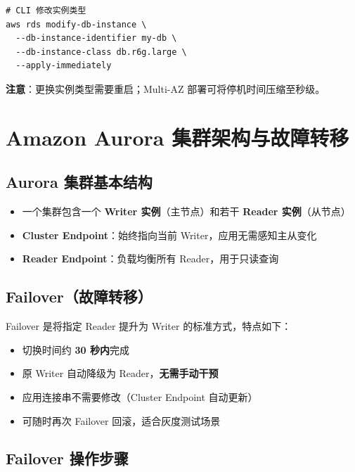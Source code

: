 \documentclass[12pt, a4paper]{article}
\begin{document}
\begin{lstlisting}
# CLI 修改实例类型
aws rds modify-db-instance \
  --db-instance-identifier my-db \
  --db-instance-class db.r6g.large \
  --apply-immediately
\end{lstlisting}

\textbf{注意}：更换实例类型需要重启；Multi-AZ 部署可将停机时间压缩至秒级。

\section{Amazon Aurora 集群架构与故障转移}

\subsection{Aurora 集群基本结构}

\begin{itemize}[leftmargin=2em]
  \item 一个集群包含一个 \textbf{Writer 实例}（主节点）和若干 \textbf{Reader 实例}（从节点）
  \item \textbf{Cluster Endpoint}：始终指向当前 Writer，应用无需感知主从变化
  \item \textbf{Reader Endpoint}：负载均衡所有 Reader，用于只读查询
\end{itemize}

\subsection{Failover（故障转移）}

Failover 是将指定 Reader 提升为 Writer 的标准方式，特点如下：

\begin{itemize}[leftmargin=2em]
  \item 切换时间约 \textbf{30 秒内}完成
  \item 原 Writer 自动降级为 Reader，\textbf{无需手动干预}
  \item 应用连接串不需要修改（Cluster Endpoint 自动更新）
  \item 可随时再次 Failover 回滚，适合灰度测试场景
\end{itemize}

\subsection{Failover 操作步骤}
\end{document}
